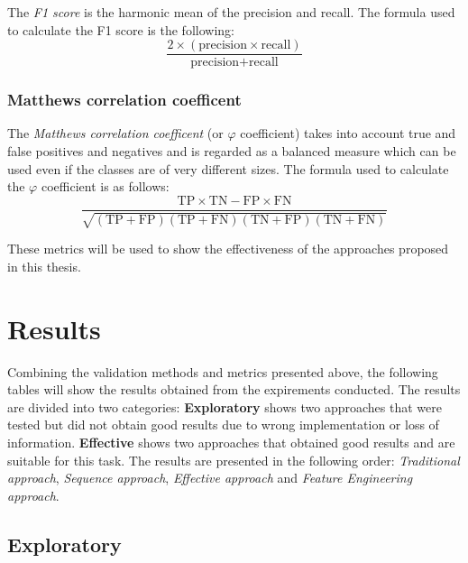                 The \textit{F1 score} is the harmonic mean of the precision and recall. The formula used to calculate the F1 score is the following:
                \begin{equation}
                    \frac{ 2 \times (\text{precision} \times \text{recall})}{\text{precision} + \text{recall}}
                \end{equation}

            \subsubsection{Matthews correlation coefficent} 

                The \textit{Matthews correlation coefficent} (or $\varphi$ coefficient) takes into account true and false positives and negatives and is regarded as a balanced measure which can be used even if the classes are of very different sizes. The formula used to calculate the $\varphi$ coefficient is as follows: 
                \begin{equation}
                    \frac{\text{TP} \times \text{TN} - \text{FP} \times \text{FN}}{\sqrt{(\text{TP} + \text{FP})(\text{TP} + \text{FN})(\text{TN} + \text{FP})(\text{TN} + \text{FN})}}
                \end{equation}

            These metrics will be used to show the effectiveness of the approaches proposed in this thesis.
    
\section{Results}
        
        Combining the validation methods and metrics presented above, the following tables will show the results obtained from the expirements conducted. The results are divided into two categories: \textbf{Exploratory} shows two approaches that were tested but did not obtain good results due to wrong implementation or loss of information. \textbf{Effective} shows two approaches that obtained good results and are suitable for this task. The results are presented in the following order: \textit{Traditional approach}, \textit{Sequence approach}, \textit{Effective approach} and \textit{Feature Engineering approach}. 

        \subsection{Exploratory}

